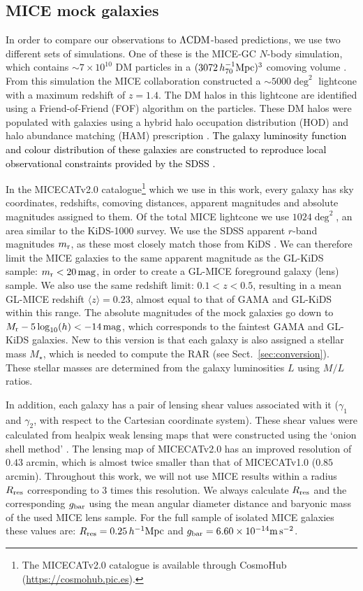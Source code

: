 \documentclass[usenatbib]{mnras}
\newcommand{\hMpc}{\, h^{-1}{\rm{Mpc}} }
\newcommand{\magn}{\, {\rm mag} }
\newcommand{\mpss}{ {\rm m}\,{\rm s}^{-2} }
\newcommand{\hsMpc}{\, h_{70}^{-1}{\rm{Mpc}} }
\newcommand{\lcdm}{{\rm \Lambda CDM}}
\newcommand*{\meanb}[1]{\langle{#1}\rangle}
\newcommand*{\E}[1]{\times 10^{#1}}
\newcommand{\un}[1]{_{\rm #1}}
\begin{document}
\subsection{MICE mock galaxies}
\label{sec:mice_mocks}

In order to compare our observations to $\lcdm$-based predictions, we use two different sets of simulations. One of these is the MICE-GC $N$-body simulation, which contains $\sim 7\E{10}$ DM particles in a $(3072 \hsMpc)^3$ comoving volume \cite[]{fosalba2015b}. From this simulation the MICE collaboration constructed a $\sim5000\deg^2$ lightcone with a maximum redshift of $z=1.4$. The DM halos in this lightcone are identified using a Friend-of-Friend (FOF) algorithm on the particles. These DM halos were populated with galaxies using a hybrid halo occupation distribution (HOD) and halo abundance matching (HAM) prescription \cite[]{carretero2015,crocce2015}. \textcolor{black}{The galaxy luminosity function and colour distribution of these galaxies are constructed to reproduce local observational constraints provided by the SDSS \cite[]{blanton2003a, blanton2003b, blanton2005}.}

In the MICECATv2.0 catalogue\footnote{The MICECATv2.0 catalogue is available through CosmoHub (\url{https://cosmohub.pic.es}).} which we use in this work, every galaxy has sky coordinates, redshifts, comoving distances, apparent magnitudes and absolute magnitudes assigned to them. Of the total MICE lightcone we use $1024\deg^2$, an area similar to the KiDS-1000 survey. We use the SDSS apparent $r$-band magnitudes $m\un{r}$, as these most closely match those from KiDS \cite[see][]{brouwer2018}. We can therefore limit the MICE galaxies to the same apparent magnitude as the GL-KiDS sample: $m\un{r}<20 \, {\rm mag}$, in order to create a GL-MICE foreground galaxy (lens) sample. We also use the same redshift limit: $0.1<z<0.5$, resulting in a mean GL-MICE redshift $\meanb{z}=0.23$, almost equal to that of GAMA and GL-KiDS within this range. The absolute magnitudes of the mock galaxies go down to $M\un{r} - 5\log_{10}(h) < -14 \magn$, which corresponds to the faintest GAMA and GL-KiDS galaxies. New to this version is that each galaxy is also assigned a stellar mass $M_\star$, which is needed to compute the RAR (see Sect.~\ref{sec:conversion}). These stellar masses are determined from the galaxy luminosities $L$ using \cite{bell2001} $M/L$ ratios.

In addition, each galaxy has a pair of lensing shear values associated with it ($\gamma_1$ and $\gamma_2$, with respect to the Cartesian coordinate system). These shear values were calculated from healpix weak lensing maps that were constructed using the `onion shell method' \cite[]{fosalba2008, fosalba2015a}. The lensing map of MICECATv2.0 has an improved resolution of $0.43$ arcmin, which is almost twice smaller than that of MICECATv1.0 ($0.85$ arcmin). Throughout this work, we will not use MICE results within a radius $R\un{res}$ corresponding to 3 times this resolution. We always calculate $R\un{res}$ and the corresponding $g\un{bar}$ using the mean angular diameter distance and baryonic mass of the used MICE lens sample. For the full sample of isolated MICE galaxies these values are: $R\un{res}=0.25 \hMpc$ and $g\un{bar}=6.60\E{-14} \mpss$.
\end{document}
